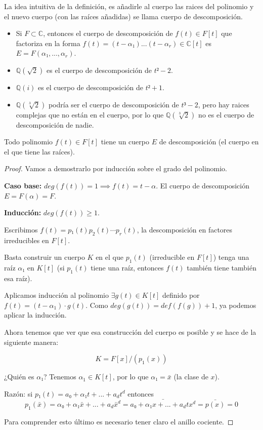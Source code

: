 \documentclass{apuntes}
\begin{document}
La idea intuitiva de la definición, es añadirle al cuerpo las raices del polinomio y el nuevo cuerpo (con las raíces añadidas) se llama cuerpo de descomposición.

\begin{example}
\begin{itemize}

\item Si $F\subset ℂ$, entonces el cuerpo de descomposición de $f(t) ∈F[t]$ que factoriza en la forma $f(t) = (t-α₁) ... (t-α_r) ∈ℂ[t]$ es $E=F(α₁,...,α_r)$.

\item $ℚ(\sqrt{2})$ es el cuerpo de descomposición de $t²-2$.

\item $ℚ(i)$ es el cuerpo de descomposición de $t²+1$.

\item $ℚ(\sqrt[3]{2})$ podría ser el cuerpo de descomposición de $t³-2$, pero hay raices complejas que no están en el cuerpo, por lo que $ℚ(\sqrt[3]{2})$ no es el cuerpo de descomposición de nadie.
\end{itemize}
\end{example}

\begin{prop}
Todo polinomio $f(t) ∈ F[t]$ tiene un cuerpo $E$ de descomposición (el cuerpo en el que tiene las raíces).
\end{prop}


\begin{proof}
Vamos a demostrarlo por inducción sobre el grado del polinomio.

\textbf{Caso base: } $deg(f(t)) = 1 \implies f(t) = t-α$.  El cuerpo de descomposición $E = F(α) = F$.

\textbf{Inducción: } $deg(f(t)) ≥1$.

Escribimos $f(t) = p₁(t)p_2(t)\cdots p_r(t)$, la descomposición en factores irreducibles en $F[t]$.

Basta construir un cuerpo $K$ en el que $p_1(t)$ (irreducible en $F[t]$) tenga una raíz $α₁$  en $K[t]$ (si $p_1(t)$ tiene una raíz, entonces $f(t)$ también tiene también esa raíz).

Aplicamos inducción al polinomio $\exists g(t)∈K[t]$ definido por $f(t) = (t-α_1) \cdot g(t)$. Como $deg(g(t)) = def(f(g)) + 1$, ya podemos aplicar la inducción.

Ahora tenemos que ver que esa construcción del cuerpo es posible y se hace de la siguiente manera:

$$K = F[x]/(p_1(x))$$

¿Quién es $α₁$? Tenemos $α_1 ∈K[t]$, por lo que $α₁ = \bar{x}$ (la clase de $x$).

Razón: si $p₁(t) = a₀ + α₁t+ ...+a_dt^d$ entonces
$$p_1(\bar{x}) = α₀+α₁\bar{x} + ... + a_d\bar{x}^d = \bar{a₀ + α₁x+ ... + a_dtx^d} = \bar{p(x)} = 0$$


Para comprender esto último es necesario tener claro el anillo cociente.
\end{proof}
\end{document}
